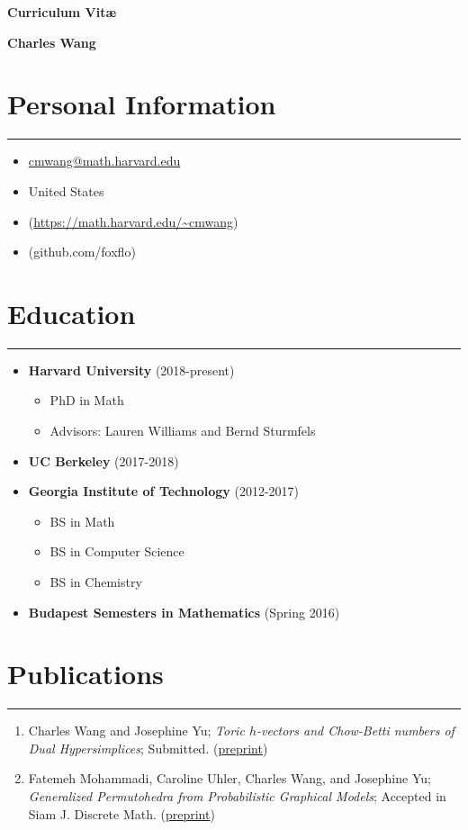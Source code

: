 \documentclass{article}
\begin{document}
\centerline{\bf\LARGE Curriculum Vit\ae}
\centerline{\bf \large Charles Wang}

\section*{Personal Information}
\noindent\rule{16.5cm}{0.6pt}

\begin{itemize}[label=\raisebox{0.25ex}{\tiny$\bullet$}]
  \setlength\itemsep{0em}
\item { \href{mailto:cmwang@math.harvard.edu}{cmwang@math.harvard.edu}}
\item { United States}
\item { (\url{https://math.harvard.edu/~cmwang})}
\item {  (github.com/foxflo)}
\end{itemize}

\section*{Education}
\noindent\rule{16.5cm}{0.6pt}
\begin{itemize}[label=\raisebox{0.25ex}{\tiny$\bullet$}]
\item {\bf Harvard University} (2018-present)
  \begin{itemize}
  \item PhD in Math
  \item Advisors: Lauren Williams and Bernd Sturmfels
  \end{itemize}
\item {\bf UC Berkeley} (2017-2018)
\item {\bf Georgia Institute of Technology} (2012-2017)
  \begin{itemize}
  \item BS in Math
  \item BS in Computer Science
  \item BS in Chemistry
  \end{itemize}
\item {\bf Budapest Semesters in Mathematics} (Spring 2016)
\end{itemize}


\section*{Publications} 
\noindent\rule{16.5cm}{0.6pt}
\begin{enumerate}
\item Charles Wang and Josephine Yu; \emph{Toric $h$-vectors and Chow-Betti numbers of Dual Hypersimplices}; Submitted. (\href{https://arxiv.org/abs/1707.04581}{preprint})
\item Fatemeh Mohammadi, Caroline Uhler, Charles Wang, and Josephine Yu; \emph{Generalized Permutohedra from Probabilistic Graphical Models}; Accepted in Siam J. Discrete Math. (\href{https://arxiv.org/abs/1606.01814}{preprint})
\end{enumerate}
\end{document}
